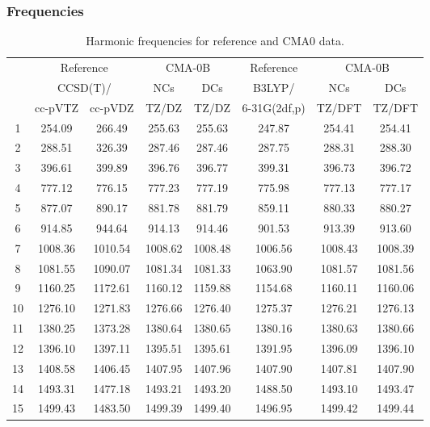\documentclass[10pt,oneside]{article}
\begin{document}
\clearpage

\subsubsection*{Frequencies}
\begin{table}[h!]
\centering
\caption{Harmonic frequencies for reference and CMA0 data.}
\begin{tabular}{cccccccc}
\toprule
{} & \multicolumn{2}{c}{Reference} & \multicolumn{2}{c}{CMA-0B} &    Reference & \multicolumn{2}{c}{CMA-0B} \\
{} & \multicolumn{2}{c}{CCSD(T)/} &     NCs &     DCs &       B3LYP/ &     NCs &     DCs \\
{} &   cc-pVTZ & cc-pVDZ &   TZ/DZ &   TZ/DZ & 6-31G(2df,p) &  TZ/DFT &  TZ/DFT \\
\midrule
1  &    254.09 &  266.49 &  255.63 &  255.63 &       247.87 &  254.41 &  254.41 \\
2  &    288.51 &  326.39 &  287.46 &  287.46 &       287.75 &  288.31 &  288.30 \\
3  &    396.61 &  399.89 &  396.76 &  396.77 &       399.31 &  396.73 &  396.72 \\
4  &    777.12 &  776.15 &  777.23 &  777.19 &       775.98 &  777.13 &  777.17 \\
5  &    877.07 &  890.17 &  881.78 &  881.79 &       859.11 &  880.33 &  880.27 \\
6  &    914.85 &  944.64 &  914.13 &  914.46 &       901.53 &  913.39 &  913.60 \\
7  &   1008.36 & 1010.54 & 1008.62 & 1008.48 &      1006.56 & 1008.43 & 1008.39 \\
8  &   1081.55 & 1090.07 & 1081.34 & 1081.33 &      1063.90 & 1081.57 & 1081.56 \\
9  &   1160.25 & 1172.61 & 1160.12 & 1159.88 &      1154.68 & 1160.11 & 1160.06 \\
10 &   1276.10 & 1271.83 & 1276.66 & 1276.40 &      1275.37 & 1276.21 & 1276.13 \\
11 &   1380.25 & 1373.28 & 1380.64 & 1380.65 &      1380.16 & 1380.63 & 1380.66 \\
12 &   1396.10 & 1397.11 & 1395.51 & 1395.61 &      1391.95 & 1396.09 & 1396.10 \\
13 &   1408.58 & 1406.45 & 1407.95 & 1407.96 &      1407.90 & 1407.81 & 1407.90 \\
14 &   1493.31 & 1477.18 & 1493.21 & 1493.20 &      1488.50 & 1493.10 & 1493.47 \\
15 &   1499.43 & 1483.50 & 1499.39 & 1499.40 &      1496.95 & 1499.42 & 1499.44 \\

\end{tabular}
\end{table}
\end{document}
